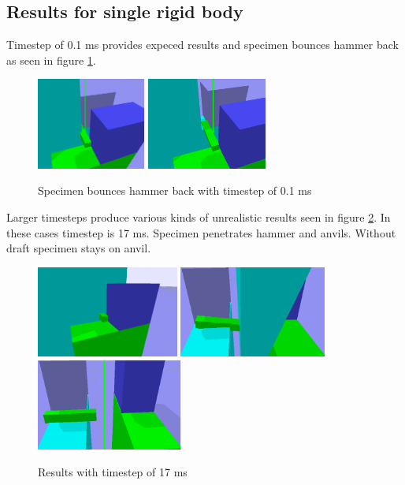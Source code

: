 \subsection{Results for single rigid body}

Timestep of 0.1 ms provides expeced results and specimen bounces hammer back as seen in figure \ref{fig:f1-ok-results}.

\begin{figure}[htb!]
\centering
\includegraphics[height=3cm]{figs/f1-18-01-1}
\includegraphics[height=3cm]{figs/f1-18-01-2}
\caption{Specimen bounces hammer back with timestep of 0.1 ms}
\label{fig:f1-ok-results}
\end{figure}

Larger timesteps produce various kinds of unrealistic results seen in figure \ref{fig:f1-nok-results}.
In these cases timestep is 17 ms. Specimen penetrates hammer and anvils.
Without draft specimen stays on anvil.

\begin{figure}[htb!]
\centering
\includegraphics[height=3cm]{figs/f1-18-17-1}
\includegraphics[height=3cm]{figs/f1-18-17-2}
\includegraphics[height=3cm]{figs/f1-18-17-3}
\caption{Results with timestep of 17 ms}
\label{fig:f1-nok-results}
\end{figure}

